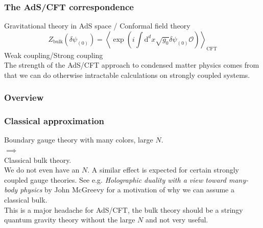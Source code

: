 \documentclass{beamer}
\renewcommand{\d}{\ensuremath{\mathrm{d}}}
\renewcommand{\i}{\ensuremath{i}}
\begin{document}
\begin{frame}
\frametitle{The AdS/CFT correspondence}
Gravitational theory in AdS space / Conformal field theory
\begin{equation}
 Z_{\mathrm{bulk}}(\delta\psi_{(0)})=\left\langle\exp(\i\int\d^dx\sqrt{g_0}\delta\psi_{(0)}\mathcal{O})\right\rangle_{\mathrm{CFT}}\label{fulCorr}
\end{equation}
Weak coupling/Strong coupling\\
The strength of the AdS/CFT approach to condensed matter physics comes from that we can do otherwise intractable calculations on strongly coupled systems.
\end{frame}

\begin{frame}
\frametitle{Overview}
\begin{figure}
 \centering
{}
\end{figure}
\end{frame}

\begin{frame}
\frametitle{Classical approximation}
Boundary gauge theory with many colors, large $N$.\\
$\implies$\\
Classical bulk theory.\\
\vspace{0.5cm}
We do not even have an $N$. A similar effect is expected for certain strongly coupled gauge theories. See e.g. \emph{Holographic duality with a view toward many-body physics} by John McGreevy for a motivation of why we can assume a classical bulk.\\
\vspace{0.5cm}
This is a major headache for AdS/CFT, the bulk theory should be a stringy quantum gravity theory without the large $N$ and not very useful.\\
\vspace{0.5cm}
\end{frame}
\end{document}
